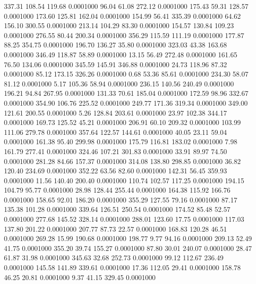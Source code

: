  337.31  108.54  119.68   0.0001000
  96.04   61.08  272.12   0.0001000
 175.43   59.31  128.57   0.0001000
 173.60  125.81  162.04   0.0001000
 154.99   56.41  335.39   0.0001000
  64.62  156.10  300.55   0.0001000
 213.14  104.29   83.30   0.0001000
 154.57  130.84  109.23   0.0001000
 276.55   80.44  200.34   0.0001000
 356.29  115.59  111.19   0.0001000
 177.87   88.25  354.75   0.0001000
 196.70  136.27   35.80   0.0001000
 323.03   43.38  163.68   0.0001000
 346.49  118.87   58.89   0.0001000
  13.15   56.49  272.48   0.0001000
 161.65   76.50  134.06   0.0001000
 345.59  145.91  346.88   0.0001000
  24.73  118.96   87.32   0.0001000
  85.12  173.15  326.26   0.0001000
   0.68   53.36   85.61   0.0001000
 234.30   58.07   81.12   0.0001000
   5.17  105.36   58.94   0.0001000
 236.15  140.56  240.49   0.0001000
 196.21   94.84  267.95   0.0001000
 131.33   70.61  185.04   0.0001000
 172.59   98.96  332.67   0.0001000
 354.90  106.76  225.52   0.0001000
 249.77  171.36  319.34   0.0001000
 349.00  121.61  200.55   0.0001000
   5.26  128.84  203.61   0.0001000
  23.97  102.38  344.17   0.0001000
 169.73  125.52   45.21   0.0001000
 206.91   60.10  209.32   0.0001000
 103.99  111.06  279.78   0.0001000
 357.64  122.57  144.61   0.0001000
  40.05   23.11   59.04   0.0001000
 161.38   95.40  299.98   0.0001000
 175.79  116.81  183.02   0.0001000
   7.98  161.79  277.41   0.0001000
 324.46  107.21  301.83   0.0001000
  33.91   89.97   74.50   0.0001000
 281.28   84.66  157.37   0.0001000
 314.08  138.80  298.85   0.0001000
  36.82  120.40  234.69   0.0001000
 352.22   63.56   82.60   0.0001000
 142.31   56.45  359.93   0.0001000
  11.56  140.40  200.40   0.0001000
 110.74  102.57  117.25   0.0001000
 194.15  104.79   95.77   0.0001000
  28.98  128.44  255.44   0.0001000
 164.38  115.92  166.76   0.0001000
 158.65   92.01  186.20   0.0001000
 355.29  127.55   79.16   0.0001000
  87.17  135.38  101.28   0.0001000
 339.64  126.51  250.54   0.0001000
 174.52   85.48   52.57   0.0001000
 277.68  145.52  328.14   0.0001000
 288.01  123.60   17.75   0.0001000
 117.03  137.80  201.22   0.0001000
 207.77   87.73   22.57   0.0001000
 168.83  120.28   46.51   0.0001000
 269.28   15.99  190.68   0.0001000
 198.77    9.77   94.16   0.0001000
 209.13   52.49   41.75   0.0001000
 355.20   39.74  155.27   0.0001000
  87.80   30.01  240.07   0.0001000
  28.47   61.87   31.98   0.0001000
 345.63   32.68  252.73   0.0001000
  99.12  112.67  236.49   0.0001000
 145.58  141.89  339.61   0.0001000
  17.36  112.05   29.41   0.0001000
 158.78   46.25   20.81   0.0001000
   9.37   41.15  329.45   0.0001000
